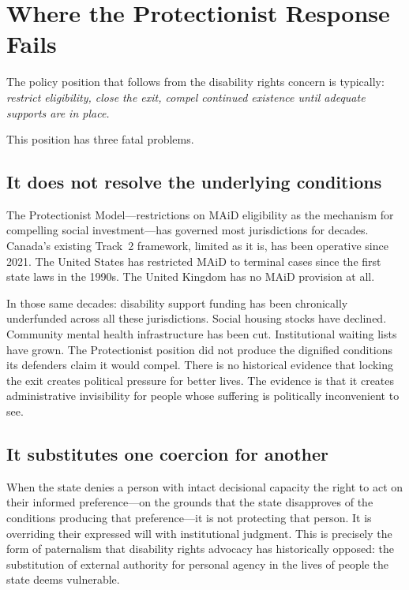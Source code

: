 \documentclass[11pt, letterpaper]{article}
\begin{document}
\section{Where the Protectionist Response Fails}

The policy position that follows from the disability rights concern is typically:
\textit{restrict eligibility, close the exit, compel continued existence until adequate
supports are in place.}

This position has three fatal problems.

\subsection{It does not resolve the underlying conditions}

The Protectionist Model---restrictions on MAiD eligibility as the mechanism for compelling
social investment---has governed most jurisdictions for decades. Canada's existing Track~2
framework, limited as it is, has been operative since 2021. The United States has restricted
MAiD to terminal cases since the first state laws in the 1990s. The United Kingdom has no
MAiD provision at all.

In those same decades: disability support funding has been chronically underfunded across
all these jurisdictions. Social housing stocks have declined. Community mental health
infrastructure has been cut. Institutional waiting lists have grown. The Protectionist
position did not produce the dignified conditions its defenders claim it would compel.
There is no historical evidence that locking the exit creates political pressure for better
lives. The evidence is that it creates administrative invisibility for people whose suffering
is politically inconvenient to see.

\subsection{It substitutes one coercion for another}

When the state denies a person with intact decisional capacity the right to act on their
informed preference---on the grounds that the state disapproves of the conditions producing
that preference---it is not protecting that person. It is overriding their expressed will
with institutional judgment. This is precisely the form of paternalism that disability rights
advocacy has historically opposed: the substitution of external authority for personal agency
in the lives of people the state deems vulnerable.
\end{document}
